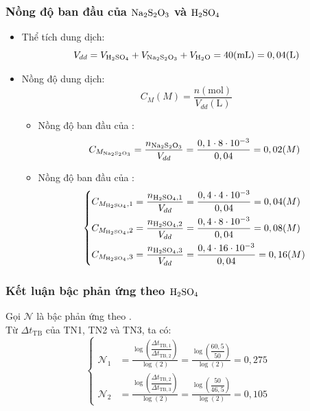 \subsubsection{Nồng độ ban đầu của \(\ce{Na2S2O3}\) và \(\ce{H2SO4}\)}
\begin{itemize}
    \item Thể tích dung dịch: \begin{equation}
        V_{dd} = V_{\ce{H2SO4}} + V_{\ce{Na2S2O3}} + V_{\ce{H2O}} = 40 (\si{\milli\liter}) = 0,04 (\si{\liter})
    \end{equation}
    \item Nồng độ dung dịch: \begin{equation}
        C_M(M) = \frac{n (\si{\mole})}{V_{dd}(\si{\liter})}
    \end{equation}
    \begin{itemize}
        \item Nồng độ ban đầu của :
        \begin{equation}
            C_{M_{\ce{Na2S2O3}}} = \frac{n_{\ce{Na2S2O3}}}{V_{dd}} = \frac{0,1 \cdot 8\cdot 10^{-3}}{0,04} = 0,02 (M)
        \end{equation}
        \item Nồng độ ban đầu của :
        \begin{equation}
            \left\{
            \begin{aligned}
                C_{M_{\ce{H2SO4}},1} &= \frac{n_{\ce{H2SO4}, 1}}{V_{dd}} = \frac{0,4 \cdot 4\cdot 10^{-3}}{0,04} = 0,04 (M) \\
                C_{M_{\ce{H2SO4}},2} &= \frac{n_{\ce{H2SO4}, 2}}{V_{dd}} = \frac{0,4 \cdot 8\cdot 10^{-3}}{0,04} = 0,08 (M) \\
                C_{M_{\ce{H2SO4}},3} &= \frac{n_{\ce{H2SO4}, 3}}{V_{dd}} = \frac{0,4 \cdot 16\cdot 10^{-3}}{0,04} = 0,16 (M)
            \end{aligned}
            \right.
        \end{equation}
    \end{itemize}
\end{itemize}

\subsubsection{Kết luận bậc phản ứng theo \(\ce{H2SO4}\)}
Gọi \(\mathcal{N}\) là bậc phản ứng theo . \\
Từ $\Delta t_{\mathrm{TB}}$ của TN1, TN2 và TN3, ta có:
\begin{equation}
    \left\{
    \begin{aligned}
        \mathcal{N}_1 &= \frac{\log\left(\dfrac{\Delta t_{\mathrm{TB},1}}{\Delta t_{\mathrm{TB},2}}\right)}{\log(2)} = \frac{\log\left(\dfrac{60,5}{50}\right)}{\log(2)} = 0,275 \\
        \mathcal{N}_2 &= \frac{\log\left(\dfrac{\Delta t_{\mathrm{TB},2}}{\Delta t_{\mathrm{TB},3}}\right)}{\log(2)} = \frac{\log\left(\dfrac{50}{46,5}\right)}{\log(2)} = 0,105
    \end{aligned}
    \right.
\end{equation}

